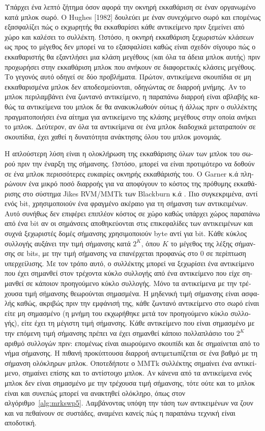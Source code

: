 \begin{greek}
Υπάρχει ένα λεπτό ζήτημα όσον αφορά την οκνηρή εκκαθάριση σε
έναν οργανωμένο κατά μπλοκ σωρό. Ο Hughes [1982] δουλεύει με 
έναν συνεχόμενο σωρό και επομένως εξασφαλίζει πώς ο εκχωρητής θα
εκκαθαρίσει κάθε αντικείμενο πριν ξεμείνει από χώρο και καλέσει
το συλλέκτη. Ωστόσο, η οκνηρή εκκαθάριση ξεχωριστών κλάσεων
ως προς το μέγεθος δεν μπορεί να το εξασφαλίσει καθώς είναι σχεδόν
σίγουρο πώς ο εκκαθαριστής θα εξαντλήσει μια κλάση μεγέθους (και
όλα τα άδεια μπλοκ αυτής) πριν προχωρήσει στην εκκαθάριση μπλοκ
που ανήκουν σε διαφορετικές κλάσεις μεγέθους. Το γεγονός αυτό
οδηγεί σε δύο προβλήματα. Πρώτον, αντικείμενα σκουπίδια σε μη
εκκαθαρισμένα μπλοκ δεν αποδεσμεύονται, οδηγώντας σε διαρροή 
μνήμης. Αν το μπλοκ περιλαμβάνει ένα ζωντανό αντικείμενο, η 
παραπάνω διαρροή είναι αβλαβής καθώς τα αντικείμενα του μπλοκ 
δε θα ανακυκλωθούν ούτως ή άλλως πριν ο συλλέκτης πραγματοποιήσει
ένα αίτημα για αντικείμενο της κλάσης μεγέθους στην οποία ανήκει
το μπλοκ. Δεύτερον, αν όλα τα αντικείμενα σε ένα μπλοκ διαδοχικά
μετατραπούν σε σκουπίδια, έχει χαθεί η δυνατότητα ανάκτησης όλου
του μπλοκ μονομιάς.

Η απλούστερη λύση είναι η ολοκλήρωση της εκκαθάρισης όλων των
μπλοκ του σωρού πριν την έναρξη της σήμανσης. Ωστόσο, μπορεί
να είναι προτιμότερο να δοθούν σε ένα μπλοκ περισσότερες ευκαιρίες
οκνηρής εκκαθάρισής του. Ο Garner κ.ά \cite{DBLP:conf/iwmm/GarnerBF07}
πληρώνουν ένα μικρό ποσό διαρροής για να αποφύγουν το κόστος
της πρόθυμης εκκαθάρισης στο σύστημα Jikes RVM/MMTk των Blackburn
κ.ά \cite{DBLP:conf/iwmm/BlackburnH04}. Πιο συγκεκριμένα, αντί
ενός bit, χρησιμοποιούν ένα φραγμένο ακέραιο για τη σήμανση των
αντικειμένων. Αυτό συνήθως δεν επιφέρει επιπλέον κόστος σε χώρο
καθώς υπάρχει χώρος παραπάνω από ένα bit αν οι σημάνσεις αποθηκεύονται
στις επικεφαλίδες των αντικειμένων και συχνά ξεχωριστές δομές
σήμανσης χρησιμοποιούν byte αντί για bit. Κάθε κύκλος συλλογής
αυξάνει την τιμή σήμανσης κατά $2^K$, όπου $K$ το μέγεθος της
λέξης σήμανσης σε bits, με την τιμή σήμανσης να επανέρχεται
προφανώς στο $0$ σε περίπτωση υπερχείλισης. Με τον τρόπο αυτό,
ο συλλέκτης μπορεί να ξεχωρίσει ένα αντικείμενο που έχει σημανθεί
στον τρέχοντα κύκλο συλλογής από ένα αντικείμενο που είχε
σημανθεί σε κάποιον προηγούμενο κύκλο συλλογής. Μόνο τα αντικείμενα
με την τρέχουσα τιμή σήμανσης θεωρούνται σημασμένα. Η μηδενική
τιμή σήμανσης είναι ασφαλής καθώς, ακριβώς πριν την εμφάνισή
της, κάθε ζωντανό αντικείμενο στο σωρό είναι είτε μη σημασμένο
(η μνήμη του εκχωρήθηκε μετά τον προηγούμενο κύκλο συλλογής),
είτε έχει τη μέγιστη τιμή σήμανσης. Κάθε αντικείμενο που είναι
σημασμένο με την επόμενη τιμή σήμανσης πρέπει να έχει σημανθεί
κάποιο πολλαπλάσιο του $2^K$ αριθμό συλλογών πριν: επομένως
είναι αιωρούμενο σκουπίδι και δε σημαίνεται από το νήμα σήμανσης.
Η πιθανή προκύπτουσα διαρροή αντιμετωπίζεται σε ένα βαθμό
με τη σήμανση ολόκληρων μπλοκ. Οποτεδήποτε ο MMTk συλλέκτης
σημαίνει ένα αντικείμενο, σημαίνει επίσης και το αντίστοιχο
μπλοκ. Αν κάνενα από τα αντικείμενα ενός μπλοκ δεν είναι
σημασμένο με την τρέχουσα τιμή σήμανσης, τότε ούτε και το
μπλοκ είναι και συνεπώς μπορεί να ανακτηθεί ολόκληρο, όπως
στον αλγόριθμο~\ref{alg:mrkswp5}. Λαμβάνοντας υπόψη την τάση
των αντικειμένων να ζουν και να πεθαίνουν σε συστάδες,
αναμένει κανείς πώς η παραπάνω τεχνική είναι αποδοτική.


\end{greek}
